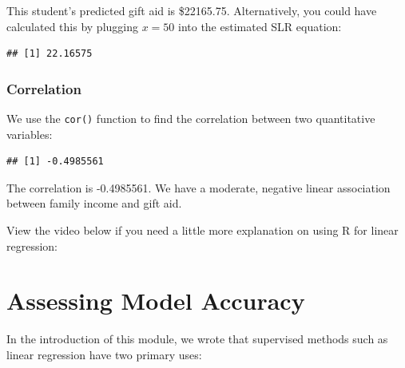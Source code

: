 \documentclass[
]{book}
\newenvironment{Shaded}{\begin{snugshade}}{\end{snugshade}}
\newcommand{\DecValTok}[1]{\textcolor[rgb]{0.00,0.00,0.81}{#1}}
\newcommand{\DocumentationTok}[1]{\textcolor[rgb]{0.56,0.35,0.01}{\textbf{\textit{#1}}}}
\newcommand{\FunctionTok}[1]{\textcolor[rgb]{0.13,0.29,0.53}{\textbf{#1}}}
\newcommand{\NormalTok}[1]{#1}
\newcommand{\SpecialCharTok}[1]{\textcolor[rgb]{0.81,0.36,0.00}{\textbf{#1}}}
\begin{document}
This student's predicted gift aid is \$22165.75. Alternatively, you could have calculated this by plugging \(x=50\) into the estimated SLR equation:

\begin{Shaded}
\end{Shaded}

\begin{verbatim}
## [1] 22.16575
\end{verbatim}

\hypertarget{correlation-1}{%
\subsubsection*{Correlation}\label{correlation-1}}

We use the \texttt{cor()} function to find the correlation between two quantitative variables:

\begin{Shaded}
\end{Shaded}

\begin{verbatim}
## [1] -0.4985561
\end{verbatim}

The correlation is -0.4985561. We have a moderate, negative linear association between family income and gift aid.

View the video below if you need a little more explanation on using R for linear regression:

\hypertarget{SLRacc}{%
\section{Assessing Model Accuracy}\label{SLRacc}}

In the introduction of this module, we wrote that supervised methods such as linear regression have two primary uses:
\end{document}
